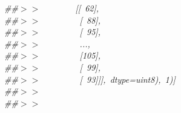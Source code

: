 \mbox{}\textit{\#\#$>$$>$\ \ \ \ \ \ \ \ [[\ 62],} \\
\mbox{}\textit{\#\#$>$$>$\ \ \ \ \ \ \ \ \ [\ 88],} \\
\mbox{}\textit{\#\#$>$$>$\ \ \ \ \ \ \ \ \ [\ 95],} \\
\mbox{}\textit{\#\#$>$$>$\ \ \ \ \ \ \ \ \ ...,\ } \\
\mbox{}\textit{\#\#$>$$>$\ \ \ \ \ \ \ \ \ [105],} \\
\mbox{}\textit{\#\#$>$$>$\ \ \ \ \ \ \ \ \ [\ 99],} \\
\mbox{}\textit{\#\#$>$$>$\ \ \ \ \ \ \ \ \ [\ 93]]],\ dtype=uint8),\ 1)]} \\
\mbox{}\textit{\#\#$>$$>$\ } \\
\mbox{}\textit{\#\#$>$$>$\ } \\
\mbox{} \\
\mbox{}
